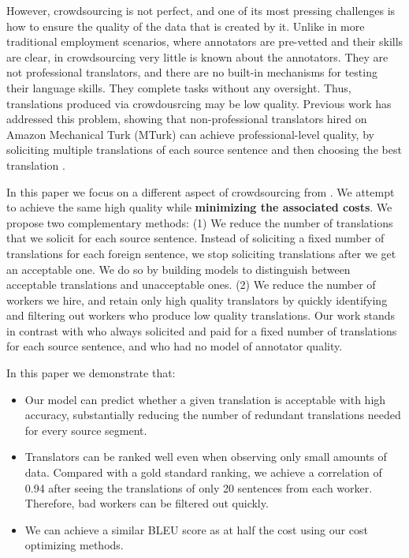 \documentclass[11pt,letterpaper]{article}
\begin{document}
However, crowdsourcing is not perfect, and one of its most pressing challenges is how to ensure the quality of the data that is created by it.  Unlike in more traditional employment scenarios, where annotators are pre-vetted and their skills are clear, in crowdsourcing very little is known about the annotators.  They are not professional translators, and there are no built-in mechanisms for testing their language skills.  They complete tasks without any oversight. Thus, translations produced via crowdousrcing may be low quality.
Previous work has addressed this problem, showing that non-professional translators hired on Amazon Mechanical Turk (MTurk) can achieve professional-level quality, by soliciting multiple translations of each source sentence and then choosing the best translation \cite{zaidan-callisonburch:2011:ACL-HLT2011a}.

In this paper we focus on a different aspect of crowdsourcing from .  We attempt to achieve the same high quality while {\bf minimizing the associated costs}.  
We propose two complementary methods:
(1) We reduce the number of translations that we solicit for each source sentence. Instead of soliciting a fixed number of translations for each foreign sentence, we stop soliciting translations after we get an acceptable one.  We do so by building models to distinguish between acceptable translations and unacceptable ones. (2) We reduce the number of workers we hire, and retain only high quality translators by quickly identifying and filtering out workers who produce low quality translations. Our work stands in contrast with   who always solicited and paid for a fixed number of translations for each source sentence, and who had no model of annotator quality. 
 
 In this paper we demonstrate that:
 \begin{itemize}
 \setlength\itemsep{0em}
 \item Our model can predict whether a given translation is acceptable with high accuracy, substantially reducing the number of redundant translations needed for every source segment.
\item Translators can be ranked well even when observing only small amounts of data. Compared with a gold standard ranking, we achieve a correlation of 0.94 after seeing the translations of only 20 sentences from each worker. Therefore, bad workers can be filtered out quickly. 
 \item We can achieve a similar BLEU score as  at half the cost using our cost optimizing methods.
 \end{itemize} 
 
\end{document}
